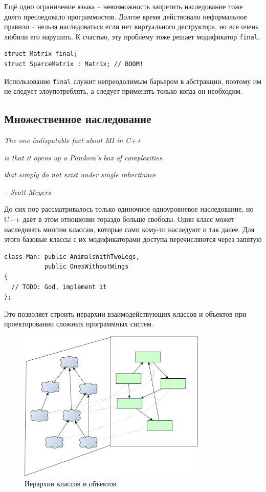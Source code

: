 \documentclass[a4paper,12pt,oneside]{article}
\begin{document}
Ещё одно ограничение языка -- невозможность запретить наследование тоже долго преследовало программистов. Долгое время действовало неформальное правило -- нельзя наследоваться если нет виртуального деструктора, но все очень любили его нарушать. К счастью, эту проблему тоже решает модификатор \lstinline!final!.

\begin{lstlisting}
struct Matrix final;
struct SparceMatrix : Matrix; // BOOM!
\end{lstlisting}

Использование \lstinline!final! служит непреодолимым барьером в абстракции, поэтому им не следует злоупотреблять, а следует применять только когда он необходим.

\pagebreak
\subsection{Множественное наследование}\label{MultipleInheritance}

\hfill\textit{The one indisputable fact about MI in C++}

\hfill\textit{is that it opens up a Pandora's box of complexities}

\hfill\textit{that simply do not exist under single inheritance}{\vspace{0.5em}}

\hfill\textit{-- Scott Meyers}

До сих пор рассматривалось только одиночное одноуровневое наследование, но C++ даёт в этом отношении гораздо больше свободы. Один класс может наследовать многим классам, которые сами кому-то наследуют и так далее. Для этого базовые классы с их модификаторами доступа перечисляются через запятую

\begin{lstlisting}
class Man: public AnimalsWithTwoLegs, 
           public OnesWithoutWings 
{
  // TODO: God, implement it
};
\end{lstlisting}

Это позволяет строить иерархии взаимодействующих классов и объектов при проектировании сложных программных систем.

\begin{figure}[h!]
\centering
\includegraphics[width=0.8\textwidth]{illustrations/hierarchies-crop.pdf}
\caption{Иерархии классов и объектов}
\label{fig:hierarchies-crop}
\end{figure}
\end{document}
